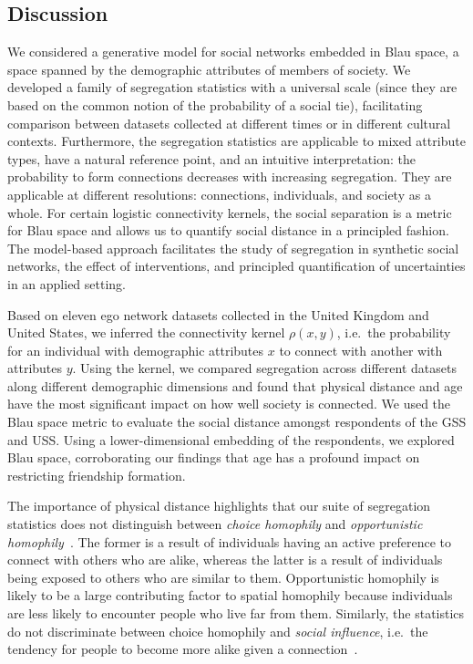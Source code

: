 \documentclass{scrartcl}
\begin{document}
\begin{refsection}
\section{Discussion\label{sec:discussion}}

We considered a generative model for social networks embedded in Blau space, a space spanned by the demographic attributes of members of society. We developed a family of segregation statistics with a universal scale (since they are based on the common notion of the probability of a social tie), facilitating comparison between datasets collected at different times or in different cultural contexts. Furthermore, the segregation statistics are applicable to mixed attribute types, have a natural reference point, and an intuitive interpretation: the probability to form connections decreases with increasing segregation. They are applicable at different resolutions: connections, individuals, and society as a whole. For certain logistic connectivity kernels, the social separation is a metric for Blau space and allows us to quantify social distance in a principled fashion. The model-based approach facilitates the study of segregation in synthetic social networks, the effect of interventions, and principled quantification of uncertainties in an applied setting.

Based on eleven ego network datasets collected in the United Kingdom and United States, we inferred the connectivity kernel $\rho(x,y)$, i.e.\ the probability for an individual with demographic attributes $x$ to connect with another with attributes $y$. Using the kernel, we compared segregation across different datasets along different demographic dimensions and found that physical distance and age have the most significant impact on how well society is connected. We used the Blau space metric to evaluate the social distance amongst respondents of the GSS and USS. Using a lower-dimensional embedding of the respondents, we explored Blau space, corroborating our findings that age has a profound impact on restricting friendship formation.

The importance of physical distance highlights that our suite of segregation statistics does not distinguish between \emph{choice homophily} and \emph{opportunistic homophily}~\cite{Franz2010}. The former is a result of individuals having an active preference to connect with others who are alike, whereas the latter is a result of individuals being exposed to others who are similar to them. Opportunistic homophily is likely to be a large contributing factor to spatial homophily because individuals are less likely to encounter people who live far from them. Similarly, the statistics do not discriminate between choice homophily and \emph{social influence}, i.e.\ the tendency for people to become more alike given a connection~\cite{Shalizi2011}.


\end{refsection}
\end{document}
